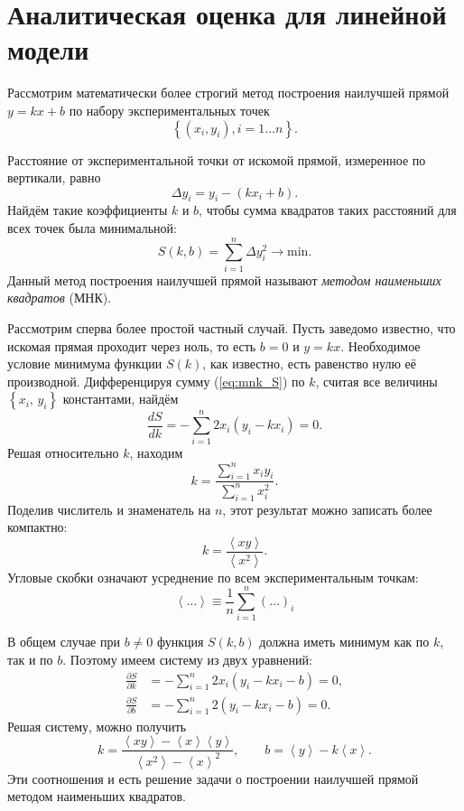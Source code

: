     
\section{Аналитическая оценка для линейной модели}

Рассмотрим математически более строгий метод построения наилучшей
прямой $y=kx+b$ по набору экспериментальных точек 
\[
\left\{ \left(x_{i},y_{i}\right),i=1\ldots n\right\} .
\]

Расстояние от экспериментальной точки от искомой прямой, измеренное
по вертикали, равно
\[
\Delta y_{i}=y_{i}-\left(kx_{i}+b\right).
\]
Найдём такие коэффициенты $k$ и $b$, чтобы сумма квадратов таких
расстояний для всех точек была минимальной:
\begin{equation}
S\!\left(k,b\right)=\sum\limits _{i=1}^{n}\Delta y_{i}^{2}\to\mathrm{min}.\label{eq:mnk_S}
\end{equation}
Данный метод построения наилучшей прямой называют \emph{методом наименьших
квадратов} (МНК).

Рассмотрим сперва более простой частный случай. Пусть заведомо известно,
что искомая прямая проходит через ноль, то есть $b=0$ и $y=kx$.
Необходимое условие минимума функции $S\left(k\right)$, как известно,
есть равенство нулю её производной. Дифференцируя сумму (\ref{eq:mnk_S})
по $k$, считая все величины $\left\{ x_{i},\,y_{i}\right\} $ константами,
найдём 
\[
\frac{dS}{dk}=-\sum\limits _{i=1}^{n}2x_{i}\left(y_{i}-kx_{i}\right)=0.
\]
Решая относительно $k$, находим 
\[
k=\frac{\sum\limits _{i=1}^{n}x_{i}y_{i}}{\sum\limits _{i=1}^{n}x_{i}^{2}}.
\]
Поделив числитель и знаменатель на $n$, этот результат можно записать
более компактно:
\begin{equation}
\boxed{k=\frac{\left\langle xy\right\rangle }{\left\langle x^{2}\right\rangle }}.\label{eq:MNK0}
\end{equation}
Угловые скобки означают усреднение по всем экспериментальным точкам:
\[
\left\langle \ldots\right\rangle \equiv\frac{1}{n}\sum\limits _{i=1}^{n}\left(\ldots\right)_{i}
\]

В общем случае при $b\ne0$ функция $S\left(k,b\right)$ должна иметь
минимум как по $k$, так и по $b$. Поэтому имеем систему из двух
уравнений:
\begin{align*}
\frac{\partial S}{\partial k} & =-\sum\limits _{i=1}^{n}2x_{i}\left(y_{i}-kx_{i}-b\right)=0,\\
\frac{\partial S}{\partial b} & =-\sum\limits _{i=1}^{n}2\left(y_{i}-kx_{i}-b\right)=0.
\end{align*}
Решая систему, можно получить
\begin{equation}
\boxed{k=\frac{\left\langle xy\right\rangle -\left\langle x\right\rangle \left\langle y\right\rangle }{\left\langle x^{2}\right\rangle -\left\langle x\right\rangle ^{2}},\qquad b=\left\langle y\right\rangle -k\left\langle x\right\rangle }.\label{eq:MNK}
\end{equation}
Эти соотношения и есть решение задачи о построении наилучшей прямой
методом наименьших квадратов.

